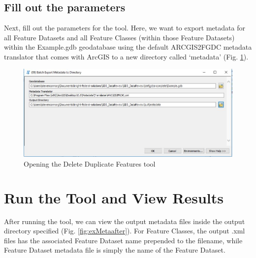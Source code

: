 \documentclass[openany]{book}
\theoremstyle{definition}
\theoremstyle{definition}
\theoremstyle{definition}
\theoremstyle{remark}
\begin{document}
\subsection{Fill out the parameters}\label{fill-out-the-parameters-10}

Next, fill out the parameters for the tool. Here, we want to export
metadata for all Feature Datasets and all Feature Classes (within those
Feature Datasets) within the Example.gdb geodatabase using the default
ARCGIS2FGDC metadata translator that comes with ArcGIS to a new
directory called `metadata' (Fig. \ref{fig:exMetaparams}).

\begin{figure}[H]

{\centering \includegraphics{figures/exMeta-params} 

}

\caption{Opening the Delete Duplicate Features tool}\label{fig:exMetaparams}
\end{figure}

\section{Run the Tool and View
Results}\label{run-the-tool-and-view-results-10}

After running the tool, we can view the output metadata files inside the
output directory specified (Fig. \ref{fig:exMetaafter}). For Feature
Classes, the output .xml files has the associated Feature Dataset name
prepended to the filename, while Feature Dataset metadata file is simply
the name of the Feature Dataset.
\end{document}
